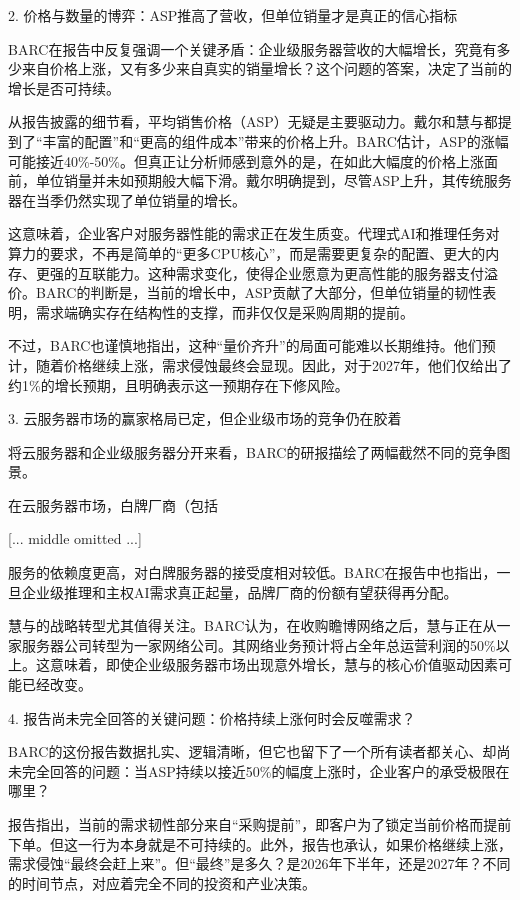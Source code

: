 \documentclass[11pt]{ctexart}
\begin{document}
2. 价格与数量的博弈：ASP推高了营收，但单位销量才是真正的信心指标

BARC在报告中反复强调一个关键矛盾：企业级服务器营收的大幅增长，究竟有多少来自价格上涨，又有多少来自真实的销量增长？这个问题的答案，决定了当前的增长是否可持续。

从报告披露的细节看，平均销售价格（ASP）无疑是主要驱动力。戴尔和慧与都提到了“丰富的配置”和“更高的组件成本”带来的价格上升。BARC估计，ASP的涨幅可能接近40\%-50\%。但真正让分析师感到意外的是，在如此大幅度的价格上涨面前，单位销量并未如预期般大幅下滑。戴尔明确提到，尽管ASP上升，其传统服务器在当季仍然实现了单位销量的增长。

这意味着，企业客户对服务器性能的需求正在发生质变。代理式AI和推理任务对算力的要求，不再是简单的“更多CPU核心”，而是需要更复杂的配置、更大的内存、更强的互联能力。这种需求变化，使得企业愿意为更高性能的服务器支付溢价。BARC的判断是，当前的增长中，ASP贡献了大部分，但单位销量的韧性表明，需求端确实存在结构性的支撑，而非仅仅是采购周期的提前。

不过，BARC也谨慎地指出，这种“量价齐升”的局面可能难以长期维持。他们预计，随着价格继续上涨，需求侵蚀最终会显现。因此，对于2027年，他们仅给出了约1\%的增长预期，且明确表示这一预期存在下修风险。

3. 云服务器市场的赢家格局已定，但企业级市场的竞争仍在胶着

将云服务器和企业级服务器分开来看，BARC的研报描绘了两幅截然不同的竞争图景。

在云服务器市场，白牌厂商（包括

[... middle omitted ...]

服务的依赖度更高，对白牌服务器的接受度相对较低。BARC在报告中也指出，一旦企业级推理和主权AI需求真正起量，品牌厂商的份额有望获得再分配。

慧与的战略转型尤其值得关注。BARC认为，在收购瞻博网络之后，慧与正在从一家服务器公司转型为一家网络公司。其网络业务预计将占全年总运营利润的50\%以上。这意味着，即使企业级服务器市场出现意外增长，慧与的核心价值驱动因素可能已经改变。

4. 报告尚未完全回答的关键问题：价格持续上涨何时会反噬需求？

BARC的这份报告数据扎实、逻辑清晰，但它也留下了一个所有读者都关心、却尚未完全回答的问题：当ASP持续以接近50\%的幅度上涨时，企业客户的承受极限在哪里？

报告指出，当前的需求韧性部分来自“采购提前”，即客户为了锁定当前价格而提前下单。但这一行为本身就是不可持续的。此外，报告也承认，如果价格继续上涨，需求侵蚀“最终会赶上来”。但“最终”是多久？是2026年下半年，还是2027年？不同的时间节点，对应着完全不同的投资和产业决策。
\end{document}
